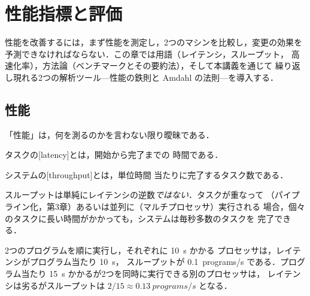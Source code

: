 \documentclass[../main.tex]{subfiles}
\begin{document}
\chapter{性能指標と評価}

性能を改善するには，まず性能を測定し，2つのマシンを比較し，変更の効果を
予測できなければならない．この章では用語（レイテンシ，スループット，
高速化率），方法論（ベンチマークとその要約法），そして本講義を通じて
繰り返し現れる2つの解析ツール---性能の鉄則と Amdahl の法則---を導入する．

\section{性能}

「性能」は，何を測るのかを言わない限り曖昧である．

\begin{definition}[レイテンシ]
  タスクの[latency]とは，開始から完了までの
  時間である．
\end{definition}

\begin{definition}[スループット]
  システムの[throughput]とは，単位時間
  当たりに完了するタスク数である．
\end{definition}

スループットは単純にレイテンシの逆数\emph{ではない}．タスクが重なって
（パイプライン化，第3章）あるいは並列に（マルチプロセッサ）実行される
場合，個々のタスクに長い時間がかかっても，システムは毎秒多数のタスクを
完了できる．

\begin{example}
  2つのプログラムを順に実行し，それぞれに \SI{10}{\second} かかる
  プロセッサは，レイテンシがプログラム当たり \SI{10}{\second}，
  スループットが \SI{0.1}{programs/s} である．プログラム当たり
  \SI{15}{\second} かかるが2つを同時に実行できる別のプロセッサは，
  レイテンシは劣るがスループットは $2/15 \approx \SI{0.13}{programs/s}$
  となる．
\end{example}
\end{document}
